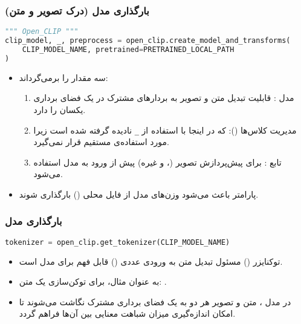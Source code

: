 \documentclass{article}
\begin{document}
\subsubsection{بارگذاری مدل  (درک تصویر و متن)}

\begin{latin}
\begin{lstlisting}[language=Python]
""" Open_CLIP """
clip_model, _, preprocess = open_clip.create_model_and_transforms(
    CLIP_MODEL_NAME, pretrained=PRETRAINED_LOCAL_PATH
)
\end{lstlisting}
\end{latin}

\begin{itemize}
    \item {} سه مقدار را برمی‌گرداند:
    \begin{enumerate}
        \item مدل : قابلیت تبدیل متن و تصویر به بردارهای مشترک در یک فضای برداری یکسان را دارد.
        \item مدیریت کلاس‌ها (): که در اینجا با استفاده از \texttt{\_} نادیده گرفته شده است زیرا مورد استفاده‌ی مستقیم قرار نمی‌گیرد.
        \item تابع : برای پیش‌پردازش تصویر (،  و غیره) پیش از ورود به مدل استفاده می‌شود.
    \end{enumerate}
    \item پارامتر  باعث می‌شود وزن‌های مدل از فایل محلی () بارگذاری شوند.
\end{itemize}

\subsubsection{بارگذاری  مدل }

\begin{latin}
\begin{lstlisting}[language=Python]
tokenizer = open_clip.get_tokenizer(CLIP_MODEL_NAME)
\end{lstlisting}
\end{latin}

\begin{itemize}
    \item توکنایزر () مسئول تبدیل متن به ورودی عددی () قابل فهم برای مدل  است.
    \item به عنوان مثال، برای توکن‌سازی یک متن: .
    \item در مدل ، متن و تصویر هر دو به یک فضای برداری مشترک نگاشت می‌شوند تا امکان اندازه‌گیری میزان شباهت معنایی بین آن‌ها فراهم گردد. 
\end{itemize}
\end{document}
